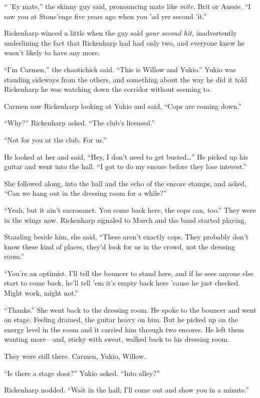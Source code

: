 `` 'Ey mate,'' the skinny guy said, pronouncing mate like \textit{mite.} Brit or Aussie. ``I saw you at Stone'enge five years ago when you 'ad yer second 'it.''

Rickenharp winced a little when the guy said \textit{your second hit,} inadvertently underlining the fact that Rickenharp had had only two, and everyone knew he wasn't likely to have any more.

``I'm Carmen,'' the chaotichick said. ``This is Willow and Yukio.'' Yukio was standing sideways from the others, and something about the way he did it told Rickenharp he was watching down the corridor without seeming to.

Carmen saw Rickenharp looking at Yukio and said, ``Cops are coming down.''

``Why?'' Rickenharp asked. ``The club's licensed.''

``Not for you or the club. For us.''

He looked at her and said, ``Hey, I don't need to get busted\ldots '' He picked up his guitar and went into the hall. ``I got to do my encore before they lose interest.''

She followed along, into the hall and the echo of the encore stomps, and asked, ``Can we hang out in the dressing room for a while?''

``Yeah, but it ain't sacrosanct. You come back here, the cops can, too.'' They were in the wings now. Rickenharp signaled to Murch and the band started playing.

Standing beside him, she said, ``These aren't exactly cops. They probably don't know these kind of places, they'd look for us in the crowd, not the dressing room.''

``You're an optimist. I'll tell the bouncer to stand here, and if he sees anyone else start to come back, he'll tell 'em it's empty back here 'cause he just checked. Might work, might not.''

``Thanks.'' She went back to the dressing room. He spoke to the bouncer and went on stage. Feeling drained, the guitar heavy on him. But he picked up on the energy level in the room and it carried him through two encores. He left them wanting more---and, sticky with sweat, walked back to his dressing room.

They were still there. Carmen, Yukio, Willow.

``Is there a stage door?'' Yukio asked. ``Into alley?''

Rickenharp nodded. ``Wait in the hall; I'll come out and show you in a minute.''

